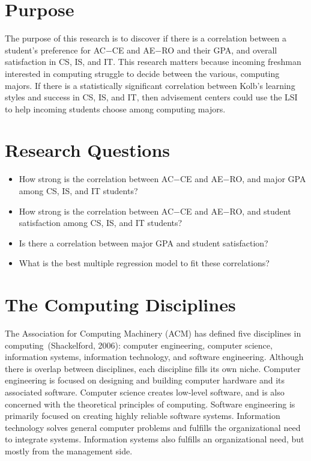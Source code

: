 \section{Purpose}
The purpose of this research is to discover if there is a correlation between a student's preference for AC$-$CE and AE$-$RO and their GPA, and overall satisfaction in CS, IS, and IT. This research matters because incoming freshman interested in computing struggle to decide between the various, computing majors. If there is a statistically significant correlation between Kolb's learning styles and success in CS, IS, and IT, then advisement centers could use the LSI to help incoming students choose among computing majors.

\section{Research Questions}
\begin{itemize}
  \item How strong is the correlation between AC$-$CE and AE$-$RO, and major GPA among CS, IS, and IT students?
  \item How strong is the correlation between AC$-$CE and AE$-$RO, and student satisfaction among CS, IS, and IT students?
  \item Is there a correlation between major GPA and student satisfaction?
  \item What is the best multiple regression model to fit these correlations?
\end{itemize}

\section{The Computing Disciplines}
The Association for Computing Machinery (ACM) has defined five disciplines in computing~(Shackelford, 2006): computer engineering, computer science, information systems, information technology, and software engineering. Although there is overlap between disciplines, each discipline fills its own niche. Computer engineering is focused on designing and building computer hardware and its associated software. Computer science creates low-level software, and is also concerned with the theoretical principles of computing. Software engineering is primarily focused on creating highly reliable software systems. Information technology solves general computer problems and fulfills the organizational need to integrate systems. Information systems also fulfills an organizational need, but mostly from the management side.

